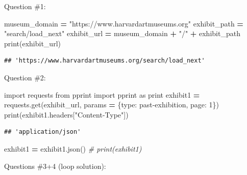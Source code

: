 \documentclass[
]{book}
\newenvironment{Shaded}{\begin{snugshade}}{\end{snugshade}}
\newcommand{\BuiltInTok}[1]{#1}
\newcommand{\CommentTok}[1]{\textcolor[rgb]{0.56,0.35,0.01}{\textit{#1}}}
\newcommand{\DecValTok}[1]{\textcolor[rgb]{0.00,0.00,0.81}{#1}}
\newcommand{\ImportTok}[1]{#1}
\newcommand{\NormalTok}[1]{#1}
\newcommand{\OperatorTok}[1]{\textcolor[rgb]{0.81,0.36,0.00}{\textbf{#1}}}
\newcommand{\StringTok}[1]{\textcolor[rgb]{0.31,0.60,0.02}{#1}}
\begin{document}
\begin{alert}

Question \#1:

\begin{Shaded}
\begin{Highlighting}[]
\NormalTok{museum\_domain }\OperatorTok{=} \StringTok{"https://www.harvardartmuseums.org"}
\NormalTok{exhibit\_path }\OperatorTok{=} \StringTok{"search/load\_next"}
\NormalTok{exhibit\_url }\OperatorTok{=}\NormalTok{ museum\_domain }\OperatorTok{+} \StringTok{"/"} \OperatorTok{+}\NormalTok{ exhibit\_path}
\BuiltInTok{print}\NormalTok{(exhibit\_url)}
\end{Highlighting}
\end{Shaded}

\begin{verbatim}
## 'https://www.harvardartmuseums.org/search/load_next'
\end{verbatim}

Question \#2:

\begin{Shaded}
\begin{Highlighting}[]
\ImportTok{import}\NormalTok{ requests}
\ImportTok{from}\NormalTok{ pprint }\ImportTok{import}\NormalTok{ pprint }\ImportTok{as} \BuiltInTok{print} 
\NormalTok{exhibit1 }\OperatorTok{=}\NormalTok{ requests.get(exhibit\_url, params }\OperatorTok{=}\NormalTok{ \{}\StringTok{\textquotesingle{}type\textquotesingle{}}\NormalTok{: }\StringTok{\textquotesingle{}past{-}exhibition\textquotesingle{}}\NormalTok{, }\StringTok{\textquotesingle{}page\textquotesingle{}}\NormalTok{: }\DecValTok{1}\NormalTok{\})}
\BuiltInTok{print}\NormalTok{(exhibit1.headers[}\StringTok{"Content{-}Type"}\NormalTok{])}
\end{Highlighting}
\end{Shaded}

\begin{verbatim}
## 'application/json'
\end{verbatim}

\begin{Shaded}
\begin{Highlighting}[]
\NormalTok{exhibit1 }\OperatorTok{=}\NormalTok{ exhibit1.json()}
\CommentTok{\# print(exhibit1)}
\end{Highlighting}
\end{Shaded}

Questions \#3+4 (loop solution):


\end{alert}
\end{document}
